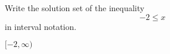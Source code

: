 

Write the solution set of the inequality
\[-2\leq x \]
in interval notation.

\begin{solution}
$[-2, \infty)$
\end{solution}